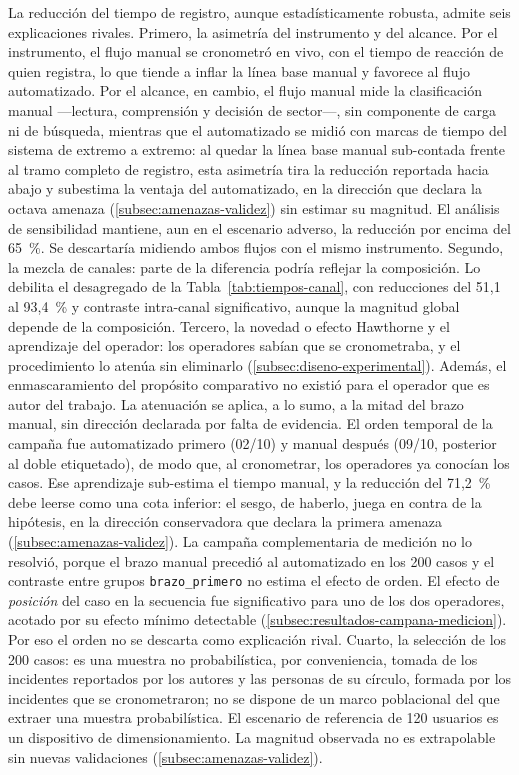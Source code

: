 La reducción del tiempo de registro, aunque estadísticamente robusta, admite seis explicaciones rivales. Primero, la asimetría del instrumento y del alcance. Por el instrumento, el flujo manual se cronometró en vivo, con el tiempo de reacción de quien registra, lo que tiende a inflar la línea base manual y favorece al flujo automatizado. Por el alcance, en cambio, el flujo manual mide la clasificación manual ---lectura, comprensión y decisión de sector---, sin componente de carga ni de búsqueda, mientras que el automatizado se midió con marcas de tiempo del sistema de extremo a extremo: al quedar la línea base manual sub-contada frente al tramo completo de registro, esta asimetría tira la reducción reportada hacia abajo y subestima la ventaja del automatizado, en la dirección que declara la octava amenaza (\autoref{subsec:amenazas-validez}) sin estimar su magnitud. El análisis de sensibilidad mantiene, aun en el escenario adverso, la reducción por encima del 65~\%. Se descartaría midiendo ambos flujos con el mismo instrumento. Segundo, la mezcla de canales: parte de la diferencia podría reflejar la composición. Lo debilita el desagregado de la Tabla~\ref{tab:tiempos-canal}, con reducciones del 51,1 al 93,4~\% y contraste intra-canal significativo, aunque la magnitud global depende de la composición. Tercero, la novedad o efecto Hawthorne y el aprendizaje del operador: los operadores sabían que se cronometraba, y el procedimiento lo atenúa sin eliminarlo (\autoref{subsec:diseno-experimental}). Además, el enmascaramiento del propósito comparativo no existió para el operador que es autor del trabajo. La atenuación se aplica, a lo sumo, a la mitad del brazo manual, sin dirección declarada por falta de evidencia. El orden temporal de la campaña fue automatizado primero (02/10) y manual después (09/10, posterior al doble etiquetado), de modo que, al cronometrar, los operadores ya conocían los casos. Ese aprendizaje sub-estima el tiempo manual, y la reducción del 71,2~\% debe leerse como una cota inferior: el sesgo, de haberlo, juega en contra de la hipótesis, en la dirección conservadora que declara la primera amenaza (\autoref{subsec:amenazas-validez}). La campaña complementaria de medición no lo resolvió, porque el brazo manual precedió al automatizado en los 200 casos y el contraste entre grupos \texttt{brazo\_primero} no estima el efecto de orden. El efecto de \emph{posición} del caso en la secuencia fue significativo para uno de los dos operadores, acotado por su efecto mínimo detectable (\autoref{subsec:resultados-campana-medicion}). Por eso el orden no se descarta como explicación rival. Cuarto, la selección de los 200 casos: es una muestra no probabilística, por conveniencia, tomada de los incidentes reportados por los autores y las personas de su círculo, formada por los incidentes que se cronometraron; no se dispone de un marco poblacional del que extraer una muestra probabilística. El escenario de referencia de 120 usuarios es un dispositivo de dimensionamiento. La magnitud observada no es extrapolable sin nuevas validaciones (\autoref{subsec:amenazas-validez}).

